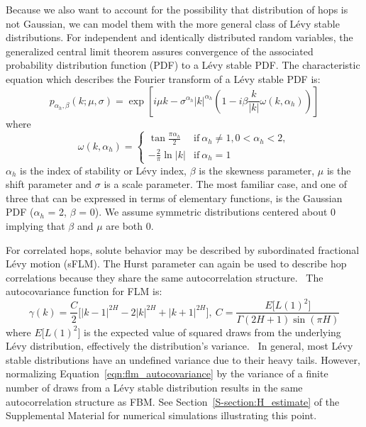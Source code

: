 \documentclass[aps,pre,preprint,groupedaddress,longbibliography]{revtex4-2}
\begin{document}
  Because we also want to account for the possibility that distribution of hops is 
  not Gaussian, we can model them with the more general class of L\'evy stable 
  distributions. For independent and identically distributed random variables, 
  the generalized central limit theorem assures convergence of the associated 
  probability distribution function (PDF) to a L\'evy stable PDF. \cite{klages_anomalous_2008}
  The characteristic equation which describes the Fourier transform of a L\'evy stable PDF is: 
  \begin{equation}
    p_{\alpha_h, \beta}(k;\mu,\sigma) =\exp\left[i\mu k - \sigma^{\alpha_h}|k|^{\alpha_h}\left(1 - i\beta\frac{k}{|k|}\omega(k, \alpha_h)\right)\right]
  \end{equation}
  where \\
  \[\omega(k, \alpha_h) = \begin{cases}
  	\tan{\frac{\pi \alpha_h}{2}} & \text{if}~\alpha_h \neq 1, 0 < \alpha_h < 2, \\
  	-\frac{2}{\pi}\ln |k| & \text{if}~\alpha_h = 1
  	 \end{cases}
  \]
  $\alpha_h$ is the index of stability or L\'evy index, $\beta$ is the skewness 
  parameter, $\mu$ is the shift parameter and $\sigma$ is a scale parameter. The most
  familiar case, and one of three that can be expressed in terms of elementary functions,
  is the Gaussian PDF ($\alpha_h$ = 2, $\beta$ = 0). We assume symmetric distributions
  centered about 0 implying that $\beta$ and $\mu$ are both 0.
  
  For correlated hops, solute behavior may be described by subordinated 
  fractional L\'evy motion (sFLM). The Hurst parameter can again be used to describe
  hop correlations because they share the same autocorrelation structure.~\cite{tikanmaki_fractional_2010}
  The autocovariance function for FLM is:
  \begin{equation}
    \gamma(k) = \dfrac{C}{2}\bigg[|k-1|^{2H} - 2|k|^{2H} + |k+1|^{2H}\bigg],
    ~C = \frac{E\big[L(1)^2\big]}{\Gamma(2H + 1)\sin(\pi H)}
    \label{eqn:flm_autocovariance}
  \end{equation}
  where $E\big[L(1)^2\big]$ is the expected value of squared draws from the 
  underlying L\'evy distribution, effectively the distribution's 
  variance.~\cite{bishwal_maximum_2011} In general, most L\'evy stable distributions
  have an undefined variance due to their heavy tails. However, normalizing
  Equation~\ref{eqn:flm_autocovariance} by the variance of a finite number of draws
  from a L\'evy stable distribution results in the same autocorrelation structure as FBM.
  See Section~\ref{S-section:H_estimate} of the Supplemental Material for numerical
  simulations illustrating this point.
  
\end{document}
